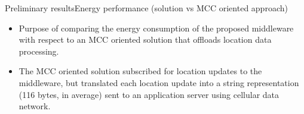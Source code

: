 \documentclass[9pt,xcolor={dvipsnames},handout]{beamer}
\begin{document}
\begin{frame}{Preliminary results}{Energy performance (solution vs MCC oriented approach)}
{
\small{}
\begin{itemize}
  \item Purpose of comparing the energy consumption of the proposed middleware with respect to an MCC oriented solution that offloads location data processing.
  \item The MCC oriented solution subscribed for location updates to the middleware, but translated each location update into a string representation (116 bytes, in average) sent to an application server using cellular data network.
\end{itemize}
}

\begin{table}
\centering
{}
\end{table}
\end{frame}
\end{document}
